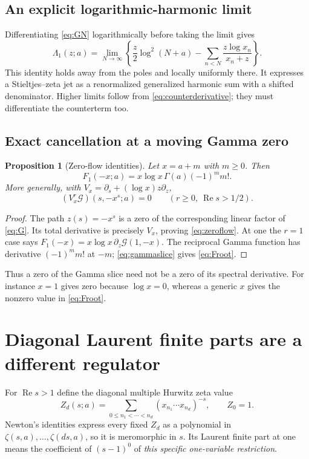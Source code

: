 \documentclass[11pt]{article}
\numberwithin{equation}{section}
\newtheorem{proposition}[theorem]{Proposition}
\theoremstyle{definition}\newtheorem{definition}[theorem]{Definition}
\theoremstyle{remark}\newtheorem{remark}[theorem]{Remark}
\DeclareMathOperator{\Rea}{Re}
\newcommand{\G}{\mathcal G}\newcommand{\F}{\mathfrak F}
\begin{document}
\subsection{An explicit logarithmic-harmonic limit}
Differentiating \eqref{eq:GN} logarithmically before taking the limit gives
\begin{equation}
 \Lambda_1(z;a)=\lim_{N\to\infty}
 \left\{\frac z2\log^2(N+a)
          -\sum_{n<N}\frac{z\log x_n}{x_n+z}\right\}.
 \label{eq:L1limit}
\end{equation}
This identity holds away from the poles and locally uniformly there.
It expresses a Stieltjes--zeta jet as a renormalized generalized harmonic
sum with a shifted denominator. Higher limits follow from
\eqref{eq:counterderivative}; they must differentiate the counterterm too.

\subsection{Exact cancellation at a moving Gamma zero}
\begin{proposition}[Zero-flow identities]
\label{prop:zeroflow}
Let $x=a+m$ with $m\ge0$. Then
\begin{equation}
 F_1(-x;a)=x\log x\,\Gamma(a)(-1)^m m!.
 \label{eq:Froot}
\end{equation}
More generally, with $V_x=\partial_s+(\log x)z\partial_z$,
\begin{equation}
 (V_x^r\G)(s,-x^s;a)=0\qquad(r\ge0,\ \Rea s>1/2).
 \label{eq:zeroflow}
\end{equation}
\end{proposition}
\begin{proof}
The path $z(s)=-x^s$ is a zero of the corresponding linear factor of
\eqref{eq:G}. Its total derivative is precisely $V_x$, proving
\eqref{eq:zeroflow}. At one the $r=1$ case says
$F_1(-x)=x\log x\,\partial_z\G(1,-x)$.
The reciprocal Gamma function has derivative $(-1)^m m!$ at $-m$;
\eqref{eq:gammaslice} gives \eqref{eq:Froot}.
\end{proof}
Thus a zero of the Gamma slice need not be a zero of its spectral derivative.
For instance $x=1$ gives zero because $\log x=0$, whereas a generic $x$
gives the nonzero value in \eqref{eq:Froot}.

\section{Diagonal Laurent finite parts are a different regulator}
\label{sec:regulator}
For $\Rea s>1$ define the diagonal multiple Hurwitz zeta value
\begin{equation}
 Z_d(s;a)=\sum_{0\le n_1<\cdots<n_d}
        (x_{n_1}\cdots x_{n_d})^{-s},\qquad Z_0=1.
 \label{eq:diagZ}
\end{equation}
Newton's identities express every fixed $Z_d$ as a polynomial in
$\zeta(s,a),\ldots,\zeta(ds,a)$, so it is meromorphic in $s$.
Its Laurent finite part at one means the coefficient of $(s-1)^0$ of
\emph{this specific one-variable restriction}.
\end{document}
